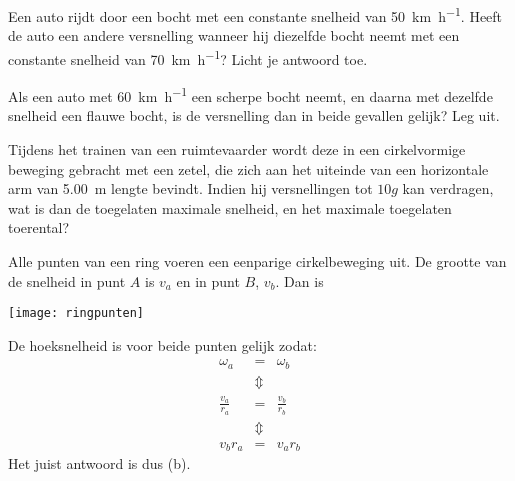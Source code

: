 \documentclass{ximera}
\begin{document}
\begin{exercise}
	Een auto rijdt door een bocht met een constante snelheid van \SI{50}{\kilo\meter\per\hour}. Heeft de auto een andere versnelling wanneer hij diezelfde bocht neemt met een constante snelheid van \SI{70}{\kilo\meter\per\hour}? Licht je antwoord toe.
\end{exercise}

\begin{exercise}
	Als een auto met \SI{60}{\kilo\meter\per\hour} een scherpe bocht neemt, en daarna met dezelfde snelheid een flauwe bocht, is de versnelling dan in beide gevallen gelijk? Leg uit.
\end{exercise}

\begin{exercise}
	Tijdens het trainen van een ruimtevaarder wordt deze in een cirkelvormige beweging gebracht met een zetel, die zich aan het uiteinde van een horizontale arm van \SI{5,00}{\meter} lengte bevindt. Indien hij versnellingen tot $10g$ kan verdragen, wat is dan de toegelaten maximale snelheid, en het maximale toegelaten toerental?
\end{exercise}

\begin{exercise}
	Alle punten van een ring voeren een eenparige cirkelbeweging uit. De grootte van de snelheid in punt $A$ is $v_a$ en in punt $B$, $v_b$. Dan is
	\newline

	\begin{minipage}{0.5\textwidth}
		\begin{multipleChoice}
		\end{multipleChoice}
	\end{minipage}
	\hfill
	\begin{minipage}{0.5\textwidth}
		\begin{image}
			\texttt{[image: ringpunten]}
		\end{image}
	\end{minipage}

\begin{oplossing}
	De hoeksnelheid is voor beide punten gelijk zodat:
\begin{eqnarray*}
\omega_a&=&\omega_b\\
&\Updownarrow&\\
\frac{v_a}{r_a}&=&\frac{v_b}{r_b}\\
&\Updownarrow&\\
v_br_a&=&v_ar_b
\end{eqnarray*}
Het juist antwoord is dus (b).
\end{oplossing}
\end{exercise}
\end{document}
